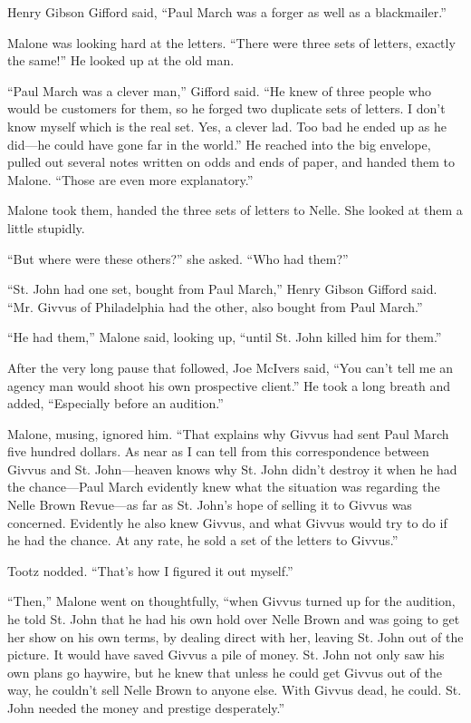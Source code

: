 \documentclass{novel}
\begin{document}
Henry Gibson Gifford said, “Paul March was a forger as well as a blackmailer.”

Malone was looking hard at the letters. “There were three sets of letters, exactly the same!” He looked up at the old man.

“Paul March was a clever man,” Gifford said. “He knew of three people who would be customers for them, so he forged two duplicate sets of letters. I don’t know myself which is the real set. Yes, a clever lad. Too bad he ended up as he did—he could have gone far in the world.” He reached into the big envelope, pulled out several notes written on odds and ends of paper, and handed them to Malone. “Those are even more explanatory.”

Malone took them, handed the three sets of letters to Nelle. She looked at them a little stupidly.

“But where were these others?” she asked. “Who had them?”

“St. John had one set, bought from Paul March,” Henry Gibson Gifford said. “Mr. Givvus of Philadelphia had the other, also bought from Paul March.”

“He had them,” Malone said, looking up, “until St. John killed him for them.”

After the very long pause that followed, Joe McIvers said, “You can’t tell me an agency man would shoot his own prospective client.” He took a long breath and added, “Especially before an audition.”

Malone, musing, ignored him. “That explains why Givvus had sent Paul March five hundred dollars. As near as I can tell from this correspondence between Givvus and St. John—heaven knows why St. John didn’t destroy it when he had the chance—Paul March evidently knew what the situation was regarding the Nelle Brown Revue—as far as St. John’s hope of selling it to Givvus was concerned. Evidently he also knew Givvus, and what Givvus would try to do if he had the chance. At any rate, he sold a set of the letters to Givvus.”

Tootz nodded. “That’s how I figured it out myself.”

“Then,” Malone went on thoughtfully, “when Givvus turned up for the audition, he told St. John that he had his own hold over Nelle Brown and was going to get her show on his own terms, by dealing direct with her, leaving St. John out of the picture. It would have saved Givvus a pile of money. St. John not only saw his own plans go haywire, but he knew that unless he could get Givvus out of the way, he couldn’t sell Nelle Brown to anyone else. With Givvus dead, he could. St. John needed the money and prestige desperately.”
\end{document}
